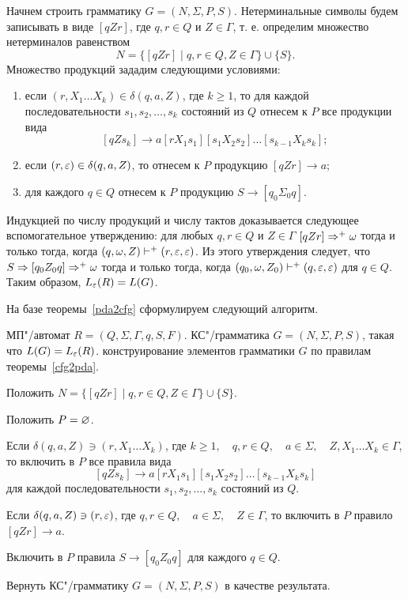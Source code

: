 \begin{myproof}
Начнем строить грамматику $G=(N,\Sigma,P,S)$. Нетерминальные символы будем записывать в виде $[qZr]$, где $q,r\in Q$ и $Z\in\Gamma$, т. е. определим множество нетерминалов равенством
\[
N =\{[qZr]\mid q,r\in Q, Z\in\Gamma\} \cup \{S\}.
\]
Множество продукций зададим следующими условиями:
\begin{enumerate}
\item если $(r,X_1\ldots X_k)\in\delta(q,a,Z)$, где $k\ge 1$, то для каждой последовательности $s_1, s_2, \ldots , s_k$ состояний из $Q$ отнесем к $P$ все продукции вида
\[
[qZs_k] \to a[rX_1s_1][s_1X_2s_2]\ldots [s_{k-1}X_ks_k];
\]
\item если $(r,\varepsilon)\in\delta(q,a,Z)$, то отнесем к $P$ продукцию $[qZr]\to a$; \\
\item для каждого $q\in Q$ отнесем к $P$ продукцию $S\to[q_0\Sigma_0q]$.
\end{enumerate}

Индукцией по числу продукций и числу тактов доказывается следующее вспомогательное утверждению: для любых $q,r\in Q$ и $Z\in\Gamma$ $[qZr]\Rightarrow^+\omega$ тогда и только тогда, когда $(q,\omega,Z)\vdash^+(r,\varepsilon,\varepsilon)$. Из этого утверждения следует, что $S\Rightarrow[q_0Z_0q]\Rightarrow^+\omega$ тогда и только тогда, когда $(q_0,\omega,Z_0)\vdash^+(q,\varepsilon,\varepsilon)$ для $q\in Q$. Таким образом, $L_\varepsilon(R)=L(G)$.
\end{myproof}

На базе теоремы~\ref{pda2cfg} сформулируем следующий алгоритм.

{\label{algo-MPetoKS} МП"/автомат $R = (Q, \Sigma, \Gamma, q, S, F)$. }
{КС"/грамматика $G = (N, \Sigma, P, S)$, такая что $L(G) = L_\varepsilon(R)$.}
{ конструирование элементов грамматики $G$ по правилам теоремы~\ref{cfg2pda}. }
{
\item Положить $N = \{ [qZr] \mid q, r \in Q, Z \in \Gamma \} \cup \{ S \}$.

\item Положить $P = \varnothing$.

\item Если $\delta(q, a, Z) \ni (r, X_1 \ldots X_k)$, где $k \geq 1, \quad q, r \in Q, \quad a \in \Sigma, \quad Z, X_1 \ldots X_k \in \Gamma$, то включить в $P$ все правила вида 
\[
	[qZs_k] \to a[rX_1s_1][s_1X_2s_2] \ldots [s_{k-1}X_ks_k]
\]  
для каждой последовательности $s_1, s_2, \ldots , s_k$ состояний из $Q$.

\item Если $\delta(q, a, Z) \ni (r, \varepsilon)$, где $q, r \in Q, \quad a \in \Sigma, \quad Z \in \Gamma$, то включить в $P$ правило $[qZr] \to a$.

\item Включить в $P$ правила $S \to [q_0Z_0q]$ для каждого $q \in Q$.

\item Вернуть КС"/грамматику $G = (N, \Sigma, P, S)$ в качестве результата.
}

